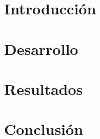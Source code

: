 \documentclass[a4paper,10pt, nofootinbib]{article}
\begin{document}
\maketitle

\tableofcontents
\clearpage

\thispagestyle{empty}


\clearpage

\section{Introducci\'on}

\clearpage

\section{Desarrollo}

\clearpage

\section{Resultados}

\clearpage

\section{Conclusi\'on}

\clearpage


\clearpage
\end{document}
